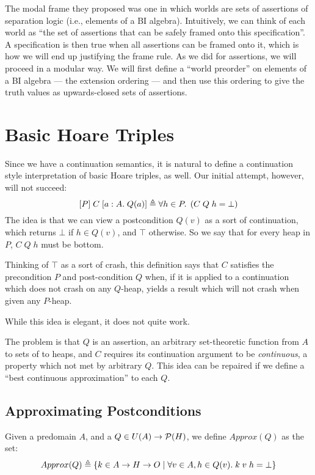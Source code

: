 The modal frame they proposed was one in which worlds are sets of
assertions of separation logic (i.e., elements of a BI algebra).
Intuitively, we can think of each world as ``the set of assertions
that can be safely framed onto this specification''. A specification
is then true when all assertions can be framed onto it, which is how
we will end up justifying the frame rule. As we did for assertions, we
will proceed in a modular way. We will first define a ``world
preorder'' on elements of a BI algebra --- the extension ordering ---
and then use this ordering to give the truth values as upwards-closed
sets of assertions.

\section{Basic Hoare Triples}

Since we have a continuation semantics, it is natural to define a
continuation style interpretation of basic Hoare triples, as well.
Our initial attempt, however, will not succeed:
\begin{displaymath}
  [{P}]\;{C}\;[{a:A}.\;{Q(a)}] \triangleq
    \forall h \in P.\; \left(C\;Q\;h = \bot\right)
\end{displaymath}
The idea is that we can view a postcondition $Q(v)$ as a sort of
continuation, which returns $\bot$ if $h \in Q(v)$, and $\top$
otherwise. So we say that for every heap in $P$, $C\;Q\;h$ must be
bottom.

Thinking of $\top$ as a sort of crash, this definition says that $C$
satisfies the precondition $P$ and post-condition $Q$ when, if it is
applied to a continuation which does not crash on any $Q$-heap, yields
a result which will not crash when given any $P$-heap.

While this idea is elegant, it does not quite work. 

The problem is that $Q$ is an assertion, an arbitrary set-theoretic
function from $A$ to sets of to heaps, and $C$ requires its
continuation argument to be \emph{continuous}, a property which not
met by arbitrary $Q$. This idea can be repaired if we define a ``best
continuous approximation'' to each $Q$.

\subsection{Approximating Postconditions}

Given a predomain $A$, and a $Q \in U(A) \to \mathcal{P}(H)$, we define $Approx(Q)$ as 
the set:
\begin{displaymath}
  Approx(Q) \triangleq \{{{k \in A \to H \to O}\;|\;{\forall v \in A, h \in Q(v).\; k\;v\;h = \bot}}\}
\end{displaymath}

